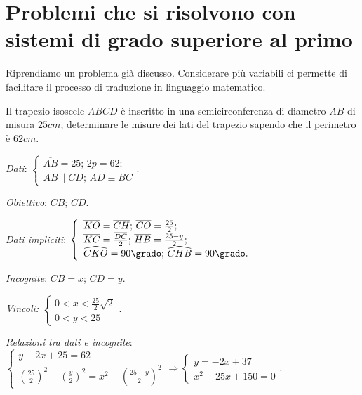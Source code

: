 \section{Problemi che si risolvono con sistemi di grado superiore al primo}

Riprendiamo un problema già discusso. Considerare più variabili ci permette di facilitare il processo di traduzione in linguaggio matematico.

\begin{problema}
Il trapezio isoscele $ABCD$ è inscritto in una semicirconferenza di diametro $AB$ di misura $25\unit{cm}$; determinare le misure dei lati del trapezio sapendo che il perimetro è $62\unit{cm}$.
\end{problema}
\begin{multicols}{2}
\emph{Dati}: $\left\{\begin{array}{l}\overline{AB}=25\text{; }2p=62;\\
AB\parallel CD\text{; }AD\equiv BC\end{array}\right.$.

\emph{Obiettivo}: $\overline{CB}$; $\overline{CD}$.

\emph{Dati impliciti}: $\left\{\begin{array}{l}
\overline{KO}=\overline{CH}\text{; }\overline{CO}=\frac{25} 2;\\ \overline{KC}=\frac{\overline{DC}} 2\text{; }\overline{HB}=\frac{25-y} 2;\\ \widehat{CKO}=90\grado\text{; }\widehat{CHB}=90\grado.\end{array}\right.$

\emph{Incognite}: $\overline{CB}=x$; $\overline{CD}=y$.

\emph{Vincoli:} $\left\{\begin{array}{l}0<x<\frac{25} 2\sqrt 2\\0<y<25 \end{array}\right.$.
\begin{center}

\end{center}
\end{multicols}

\emph{Relazioni tra dati e incognite}:
$ \left\{\begin{array}{l}{y+2x+25=62}\\{\left(\frac{25} 2\right)^2-\left(\frac y 2\right)^2=x^2-\left(\frac{25-y} 2\right)^2}\end{array}\right. \Rightarrow \left\{\begin{array}{l}{y=-2x+37}\\{x^2-25x+150=0}\end{array}\right..$

